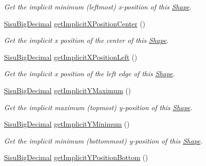 \begin{DoxyCompactItemize}
\begin{DoxyCompactList}\small\item\em Get the implicit minimum (leftmost) x-\/position of this \hyperlink{classcom_1_1aarrelaakso_1_1drawl_1_1_shape}{Shape}. \end{DoxyCompactList}\item 
\hyperlink{classcom_1_1aarrelaakso_1_1drawl_1_1_sisu_big_decimal}{Sisu\+Big\+Decimal} \hyperlink{classcom_1_1aarrelaakso_1_1drawl_1_1_shape_a50c12c30790bd28ec0b71b58f59b1e96}{get\+Implicit\+X\+Position\+Center} ()
\begin{DoxyCompactList}\small\item\em Get the implicit x position of the center of this \hyperlink{classcom_1_1aarrelaakso_1_1drawl_1_1_shape}{Shape}. \end{DoxyCompactList}\item 
\hyperlink{classcom_1_1aarrelaakso_1_1drawl_1_1_sisu_big_decimal}{Sisu\+Big\+Decimal} \hyperlink{classcom_1_1aarrelaakso_1_1drawl_1_1_shape_ad9b2aee9937d5f034f7f4a2a1d979260}{get\+Implicit\+X\+Position\+Left} ()
\begin{DoxyCompactList}\small\item\em Get the implicit x position of the left edge of this \hyperlink{classcom_1_1aarrelaakso_1_1drawl_1_1_shape}{Shape}. \end{DoxyCompactList}\item 
\hyperlink{classcom_1_1aarrelaakso_1_1drawl_1_1_sisu_big_decimal}{Sisu\+Big\+Decimal} \hyperlink{classcom_1_1aarrelaakso_1_1drawl_1_1_shape_a7a4579f2966a3d5ebbfa46b5b2528f9d}{get\+Implicit\+Y\+Maximum} ()
\begin{DoxyCompactList}\small\item\em Get the implicit maximum (topmost) y-\/position of this \hyperlink{classcom_1_1aarrelaakso_1_1drawl_1_1_shape}{Shape}. \end{DoxyCompactList}\item 
\hyperlink{classcom_1_1aarrelaakso_1_1drawl_1_1_sisu_big_decimal}{Sisu\+Big\+Decimal} \hyperlink{classcom_1_1aarrelaakso_1_1drawl_1_1_shape_aa0877965f7f172378e87ba69f27c7ad6}{get\+Implicit\+Y\+Minimum} ()
\begin{DoxyCompactList}\small\item\em Get the implicit minimum (bottommost) y-\/position of this \hyperlink{classcom_1_1aarrelaakso_1_1drawl_1_1_shape}{Shape}. \end{DoxyCompactList}\item 
\hyperlink{classcom_1_1aarrelaakso_1_1drawl_1_1_sisu_big_decimal}{Sisu\+Big\+Decimal} \hyperlink{classcom_1_1aarrelaakso_1_1drawl_1_1_shape_a5116673c093c60f66bba9fddf9533db6}{get\+Implicit\+Y\+Position\+Bottom} ()

\end{DoxyCompactItemize}
